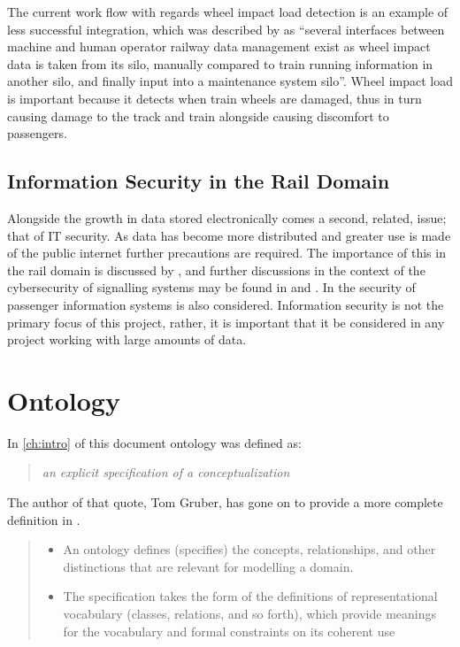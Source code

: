 The current work flow with regards wheel impact load detection is an example of less successful integration, which was described by \citet{Tutcher2015} as  ``several interfaces between machine and human operator railway data management exist as wheel impact data is taken from its silo, manually compared to train running information in another silo, and finally input into a maintenance system silo''. Wheel impact load is important because it detects when train wheels are damaged, thus in turn causing damage to the track and train alongside causing discomfort to passengers.

\subsection{Information Security in the Rail Domain}

Alongside the growth in data stored electronically comes a second, related, issue; that of IT security. As data has become more distributed and greater use is made of the public internet further precautions are required. The importance of this in the rail domain is discussed by \citet{Depar2016}, and further discussions in the context of the cybersecurity of signalling systems may be found in \citep{BloomField2016} and \citep{Chen2015}. In \citet{Chen2015} the security of passenger information systems is also considered. Information security is not the primary focus of this project, rather, it is important that it be considered in any project working with large amounts of data.

\section{Ontology}\label{onto}
In \autoref{ch:intro} of this document ontology was defined as: 
\begin{quote}
\emph{an explicit specification of a conceptualization}
\end{quote}
The author of that quote, Tom Gruber, has gone on to provide a more complete definition in \citep{Gru09}. 

\begin{quote}
\begin{itemize}
\item An ontology defines (specifies) the concepts, relationships, and other distinctions that are relevant for modelling a domain.
\item The specification takes the form of the definitions of representational vocabulary (classes, relations, and so forth), which provide meanings for the vocabulary and formal constraints on its coherent use
\end{itemize}
\end{quote}


